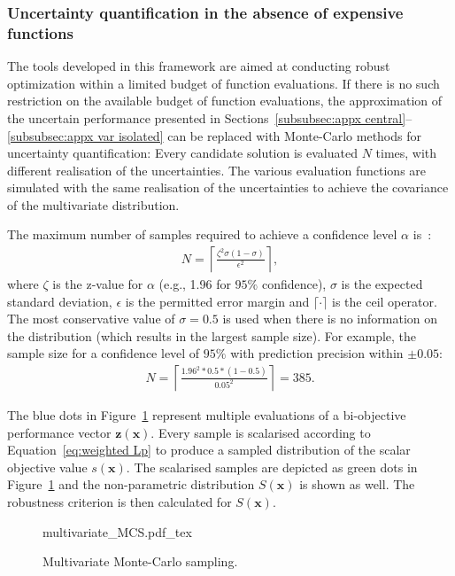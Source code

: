 \documentclass[a4paper]{article}
\newcommand{\brr}[1]{{\left({#1}\right)}} %
\newcommand{\vx}{\ensuremath{\mathbf{x}}} %
\newcommand{\vz}{\ensuremath{\mathbf{z}}} %
\begin{document}
\subsubsection{Uncertainty quantification in the absence of expensive functions}
\label{subsubsec:simple uncertainty quantification}
The tools developed in this framework are aimed at conducting robust optimization within a limited budget of function evaluations. If there is no such restriction on the available budget of function evaluations, the approximation of the uncertain performance presented in Sections~\ref{subsubsec:appx central}--\ref{subsubsec:appx var isolated} can be replaced with Monte-Carlo methods for uncertainty quantification: Every candidate solution is evaluated $N$ times, with different realisation of the uncertainties. The various evaluation functions are simulated with the same realisation of the uncertainties to achieve the covariance of the multivariate distribution.

The maximum number of samples required to achieve a confidence level $\alpha$ is~\cite{kotrlik2001organizational}:
\begin{align}
\label{eq:sample size}
N=\left\lceil\frac{\zeta^2\sigma(1-\sigma)}{\epsilon^2}\right\rceil,
\end{align}
where $\zeta$ is the z-value for $\alpha$ (e.g., 1.96 for $95\%$ confidence), $\sigma$ is the expected standard deviation, $\epsilon$ is the permitted error margin and $\lceil\cdot\rceil$ is the ceil operator. The most conservative value of $\sigma=0.5$ is used when there is no information on the distribution (which results in the largest sample size). For example, the sample size for a confidence level of $95\%$ with prediction precision within $\pm 0.05$:
\begin{align}
N=\left\lceil\frac{1.96^2*0.5*(1-0.5)}{0.05^2}\right\rceil=385.
\end{align}

The blue dots in Figure~\ref{fig:multivariate_MCS} represent multiple evaluations of a bi-objective performance vector $\vz\brr{\vx}$. Every sample is scalarised according to Equation~\eqref{eq:weighted Lp} to produce a sampled distribution of the scalar objective value $s\brr{\vx}$. The scalarised samples are depicted as green dots in Figure~\ref{fig:multivariate_MCS} and the non-parametric distribution $S\brr{\vx}$ is shown as well. The robustness criterion is then calculated for $S\brr{\vx}$.

\begin{figure}
	\centering
	\def\svgwidth{0.4\textwidth}
	{multivariate_MCS.pdf_tex}
	\caption{Multivariate Monte-Carlo sampling.}
	\label{fig:multivariate_MCS}
\end{figure}
\end{document}
